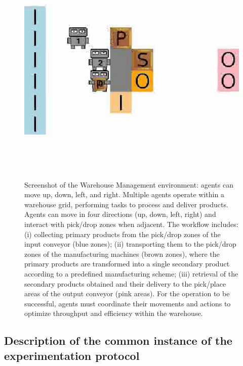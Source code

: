 \begin{figure}[h!]
\centering
\includegraphics[trim=0cm 3cm 0cm 3cm, clip, width=0.9\linewidth]{figures/wm.png}
\caption[Screenshot of the Warehouse Management environment]{Screenshot of the Warehouse Management environment: agents can move up, down, left, and right. Multiple agents operate within a warehouse grid, performing tasks to process and deliver products. Agents can move in four directions (up, down, left, right) and interact with pick/drop zones when adjacent. The workflow includes: (i) collecting primary products from the pick/drop zones of the input conveyor (blue zones); (ii) transporting them to the pick/drop zones of the manufacturing machines (brown zones), where the primary products are transformed into a single secondary product according to a predefined manufacturing scheme; (iii) retrieval of the secondary products obtained and their delivery to the pick/place areas of the output conveyor (pink areas). For the operation to be successful, agents must coordinate their movements and actions to optimize throughput and efficiency within the warehouse.}
\label{fig:warehouse}
\end {figure}


\subsection{Description of the common instance of the experimentation protocol}

